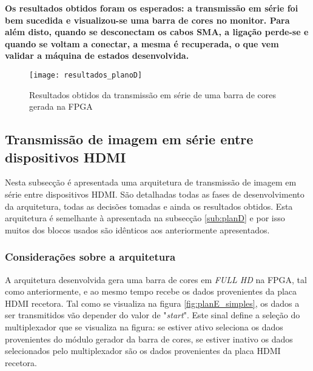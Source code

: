 \begin{center}
	\lrboxbrace[\Vert][\Vert] {}
	{\textbf{Os resultados obtidos foram os esperados: a transmissão em série foi bem sucedida e visualizou-se uma barra de cores no monitor. Para além disto, quando se desconectam os cabos SMA, a ligação perde-se e quando se voltam a conectar, a mesma é recuperada, o que vem validar a máquina de estados desenvolvida.}}
\end{center}

\begin{figure}[h!]
	\begin{center}
		\leavevmode
		\texttt{[image: resultados\_planoD]}
		\captionsetup{width=1.0\linewidth}
		\caption[Resultados obtidos da transmissão em série de uma barra de cores gerada na FPGA]{Resultados obtidos da transmissão em série de uma barra de cores gerada na FPGA}
		\label{fig:planD_resultados}
	\end{center}
\end{figure}



\subsection{Transmissão de imagem em série entre dispositivos HDMI} \label{sub:planE}

Nesta subsecção é apresentada uma arquitetura de transmissão de imagem em série entre dispositivos HDMI. São detalhadas todas as fases de desenvolvimento da arquitetura, todas as decisões tomadas e ainda os resultados obtidos. Esta arquitetura é semelhante à apresentada na subsecção \ref{sub:planD} e por isso muitos dos blocos usados são idênticos aos anteriormente apresentados.

\subsubsection{Considerações sobre a arquitetura} \label{subsub:planE_considerações}

A arquitetura desenvolvida gera uma barra de cores em \textit{FULL HD} na FPGA, tal como anteriormente, e ao mesmo tempo recebe os dados provenientes da placa HDMI recetora. Tal como se visualiza na figura \ref{fig:planE_simples}, os dados a ser transmitidos vão depender do valor de "\textit{start}". Este sinal define a seleção do multiplexador que se visualiza na figura: se estiver ativo seleciona os dados provenientes do módulo gerador da barra de cores, se estiver inativo os dados selecionados pelo multiplexador são os dados provenientes da placa HDMI recetora.

